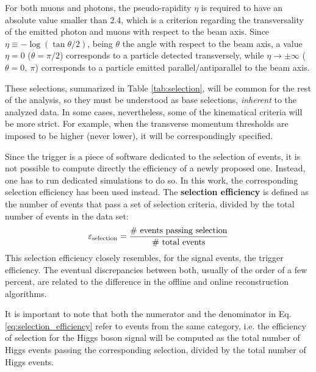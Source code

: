 \documentclass[11pt, a4paper]{article}
\begin{document}
For both muons and photons, the pseudo-rapidity $\eta$ is required to have an absolute value smaller than 2.4, which is a criterion regarding the transversality of the emitted photon and muons with respect to the beam axis. Since $\eta \equiv -\log (\tan\theta / 2)$, being $\theta$ the angle with respect to the beam axis, a value $\eta = 0$ ($\theta = \pi/2$) corresponds to a particle detected transversely, while $\eta\rightarrow \pm\infty$ ($\theta = 0,\ \pi$) corresponds to a particle emitted parallel/antiparallel to the beam axis.

These selections, summarized in Table \ref{tab:selection}, will be common for the rest of the analysis, so they must be understood as base selections, {\it inherent} to the analyzed data. In some cases, nevertheless, some of the kinematical criteria will be more strict. For example, when the transverse momentum thresholds are imposed to be higher (never lower), it will be correspondingly specified.

Since the trigger is a piece of software dedicated to the selection of events, it is not possible to compute directly the efficiency of a newly proposed one. Instead, one has to run dedicated simulations to do so. In this work, the corresponding selection efficiency has been used instead. The {\bf selection efficiency} is defined as the number of events that pass a set of selection criteria, divided by the total number of events in the data set:
\begin{equation}
    \varepsilon_{\rm selection} = \frac{{\rm \#\ events\ passing\ selection}}{{\rm \#\ total\ events}}
    \label{eq:selection_efficiency}
\end{equation}
This selection efficiency closely resembles, for the signal events, the trigger efficiency. The eventual discrepancies between both, usually of the order of a few percent, are related to the difference in the offline and online reconstruction algorithms.

It is important to note that both the numerator and the denominator in Eq. \ref{eq:selection_efficiency} refer to events from the same category, i.e. the efficiency of selection for the Higgs boson signal will be computed as the total number of Higgs events passing the corresponding selection, divided by the total number of Higgs events.
\end{document}

